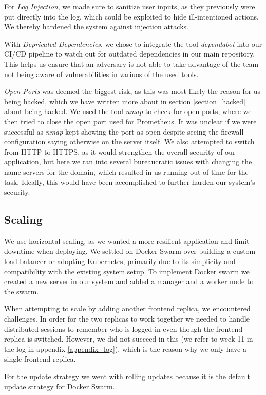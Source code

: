 For \textit{Log Injection}, we made sure to sanitize user inputs, as they previously were put directly into the log, which could be exploited to hide ill-intentioned actions. We thereby hardened the system against injection attacks.

With \textit{Depricated Dependencies}, we chose to integrate the tool \textit{dependabot} into our CI/CD pipeline to watch out for outdated dependencies in our main repository. This helps us ensure that an adversary is not able to take advantage of the team not being aware of vulnerabilities in variuos of the used tools.

\textit{Open Ports} was deemed the biggest risk, as this was most likely the reason for us being hacked, which we have written more about in section \ref{section_hacked} about being hacked. We used the tool \textit{nmap} to check for open ports, where we then tried to close the open port used for Prometheus. It was unclear if we were successful as \textit{nmap} kept showing the port as open despite seeing the firewall configuration saying otherwise on the server itself.
We also attempted to switch from HTTP to HTTPS, as it would strengthen the overall security of our application, but here we ran into several bureaucratic issues with changing the name servers for the domain, which resulted in us running out of time for the task. Ideally, this would have been accomplished to further harden our system's security.

\subsection{Scaling}
We use horizontal scaling, as we wanted a more resilient application and limit downtime when deploying. We settled on Docker Swarm over building a custom load balancer or adopting Kubernetes, primarily due to its simplicity and compatibility with the existing system setup. To implement Docker swarm we created a new server in our system and added a manager and a worker node to the swarm.

When attempting to scale by adding another frontend replica, we encountered challenges. In order for the two replicas to work together we needed to handle distributed sessions to remember who is logged in even though the frontend replica is switched. However, we did not succeed in this (we refer to week 11 in the log in appendix \ref{appendix_log}), which is the reason why we only have a single frontend replica.

For the update strategy we went with rolling updates because it is the default update strategy for Docker Swarm.
